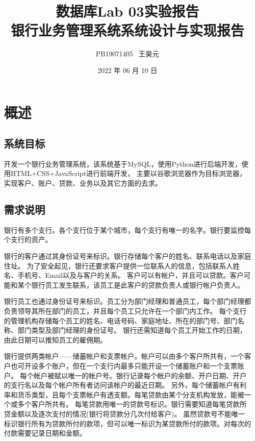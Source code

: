 \documentclass{article}
\title{数据库Lab 03实验报告 \\ \small{银行业务管理系统系统设计与实现报告}}
\author{PB19071405 \ 王昊元}
\date{2022 年 06 月 10 日}
\begin{document}
    \maketitle
    \thispagestyle{empty}

    \newpage
    \tableofcontents
    \thispagestyle{empty}

    \newpage
    \setcounter{page}{1}

    \section{概述}
    \subsection{系统目标}
    开发一个银行业务管理系统，该系统基于MySQL，使用Python进行后端开发，使用HTML+CSS+JavaScript进行前端开发，
    主要以谷歌浏览器作为目标浏览器，实现客户、账户、贷款、业务以及其它方面的去求。
    \subsection{需求说明}
    银行有多个支行。各个支行位于某个城市，每个支行有唯一的名字。银行要监控每个支行的资产。

    银行的客户通过其身份证号来标识。银行存储每个客户的姓名、联系电话以及家庭住址。
    为了安全起见，银行还要求客户提供一位联系人的信息，包括联系人姓名、手机号、Email以及与客户的关系。
    客户可以有帐户，并且可以贷款。客户可能和某个银行员工发生联系，该员工是此客户的贷款负责人或银行帐户负责人。
    
    银行员工也通过身份证号来标识。员工分为部门经理和普通员工，每个部门经理都负责领导其所在部门的员工，并且每个员工只允许在一个部门内工作。
    每个支行的管理机构存储每个员工的姓名、电话号码、家庭地址、所在的部门号、部门名称、部门类型及部门经理的身份证号。
    银行还需知道每个员工开始工作的日期，由此日期可以推知员工的雇佣期。
    
    银行提供两类帐户——储蓄帐户和支票帐户。帐户可以由多个客户所共有，一个客户也可开设多个账户，但在一个支行内最多只能开设一个储蓄账户和一个支票账户。
    每个帐户被赋以唯一的帐户号。银行记录每个帐户的余额、开户日期、开户的支行名以及每个帐户所有者访问该帐户的最近日期。
    另外，每个储蓄帐户有利率和货币类型，且每个支票帐户有透支额。每笔贷款由某个分支机构发放，能被一个或多个客户所共有。
    每笔贷款用唯一的贷款号标识。银行需要知道每笔贷款所贷金额以及逐次支付的情况(银行将贷款分几次付给客户)。
    虽然贷款号不能唯一标识银行所有为贷款所付的款项，但可以唯一标识为某贷款所付的款项。对每次的付款需要记录日期和金额。
\end{document}
